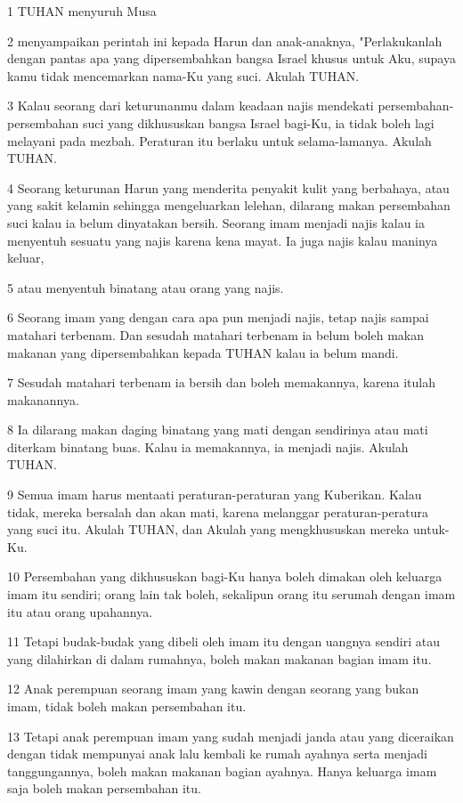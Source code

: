 \par 1 TUHAN menyuruh Musa
\par 2 menyampaikan perintah ini kepada Harun dan anak-anaknya, "Perlakukanlah dengan pantas apa yang dipersembahkan bangsa Israel khusus untuk Aku, supaya kamu tidak mencemarkan nama-Ku yang suci. Akulah TUHAN.
\par 3 Kalau seorang dari keturunanmu dalam keadaan najis mendekati persembahan-persembahan suci yang dikhususkan bangsa Israel bagi-Ku, ia tidak boleh lagi melayani pada mezbah. Peraturan itu berlaku untuk selama-lamanya. Akulah TUHAN.
\par 4 Seorang keturunan Harun yang menderita penyakit kulit yang berbahaya, atau yang sakit kelamin sehingga mengeluarkan lelehan, dilarang makan persembahan suci kalau ia belum dinyatakan bersih. Seorang imam menjadi najis kalau ia menyentuh sesuatu yang najis karena kena mayat. Ia juga najis kalau maninya keluar,
\par 5 atau menyentuh binatang atau orang yang najis.
\par 6 Seorang imam yang dengan cara apa pun menjadi najis, tetap najis sampai matahari terbenam. Dan sesudah matahari terbenam ia belum boleh makan makanan yang dipersembahkan kepada TUHAN kalau ia belum mandi.
\par 7 Sesudah matahari terbenam ia bersih dan boleh memakannya, karena itulah makanannya.
\par 8 Ia dilarang makan daging binatang yang mati dengan sendirinya atau mati diterkam binatang buas. Kalau ia memakannya, ia menjadi najis. Akulah TUHAN.
\par 9 Semua imam harus mentaati peraturan-peraturan yang Kuberikan. Kalau tidak, mereka bersalah dan akan mati, karena melanggar peraturan-peratura yang suci itu. Akulah TUHAN, dan Akulah yang mengkhususkan mereka untuk-Ku.
\par 10 Persembahan yang dikhususkan bagi-Ku hanya boleh dimakan oleh keluarga imam itu sendiri; orang lain tak boleh, sekalipun orang itu serumah dengan imam itu atau orang upahannya.
\par 11 Tetapi budak-budak yang dibeli oleh imam itu dengan uangnya sendiri atau yang dilahirkan di dalam rumahnya, boleh makan makanan bagian imam itu.
\par 12 Anak perempuan seorang imam yang kawin dengan seorang yang bukan imam, tidak boleh makan persembahan itu.
\par 13 Tetapi anak perempuan imam yang sudah menjadi janda atau yang diceraikan dengan tidak mempunyai anak lalu kembali ke rumah ayahnya serta menjadi tanggungannya, boleh makan makanan bagian ayahnya. Hanya keluarga imam saja boleh makan persembahan itu.
